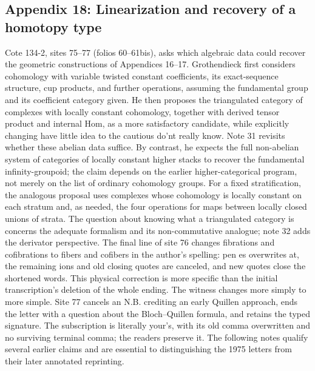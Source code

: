 \subsection*{Appendix 18: Linearization and recovery of a homotopy type}
Cote 134-2, sites 75--77 (folios 60--61bis), asks which algebraic data could recover the geometric constructions of Appendices 16--17. Grothendieck first considers cohomology with variable twisted constant coefficients, its exact-sequence structure, cup products, and further operations, assuming the fundamental group and its coefficient category given. He then proposes the triangulated category of complexes with locally constant cohomology, together with derived tensor product and internal Hom, as a more satisfactory candidate, while explicitly changing have little idea to the cautious do'nt really know. Note 31 revisits whether these abelian data suffice. By contrast, he expects the full non-abelian system of categories of locally constant higher stacks to recover the fundamental infinity-groupoid; the claim depends on the earlier higher-categorical program, not merely on the list of ordinary cohomology groups. For a fixed stratification, the analogous proposal uses complexes whose cohomology is locally constant on each stratum and, as needed, the four operations for maps between locally closed unions of strata. The question about knowing what a triangulated category is concerns the adequate formalism and its non-commutative analogue; note 32 adds the derivator perspective. The final line of site 76 changes fibrations and cofibrations to fibers and cofibers in the author's spelling: pen es overwrites at, the remaining ions and old closing quotes are canceled, and new quotes close the shortened words. This physical correction is more specific than the initial transcription's deletion of the whole ending. The witness changes more simply to more simple. Site 77 cancels an N.B. crediting an early Quillen approach, ends the letter with a question about the Bloch--Quillen formula, and retains the typed signature. The subscription is literally your's, with its old comma overwritten and no surviving terminal comma; the readers preserve it. The following notes qualify several earlier claims and are essential to distinguishing the 1975 letters from their later annotated reprinting.

